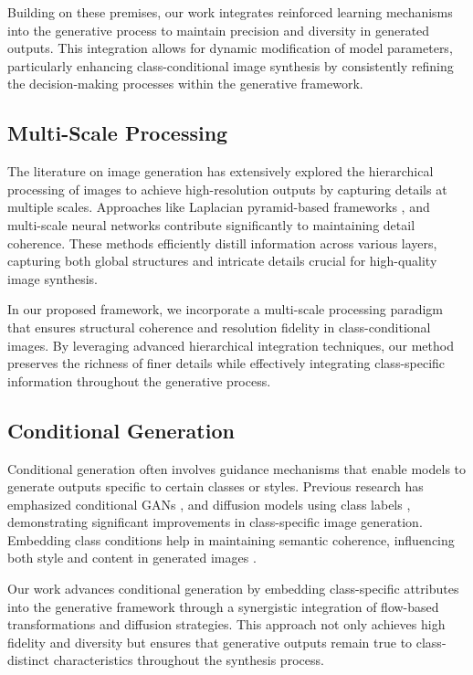 \documentclass{article} %
\begin{document}
Building on these premises, our work integrates reinforced learning mechanisms into the generative process to maintain precision and diversity in generated outputs. This integration allows for dynamic modification of model parameters, particularly enhancing class-conditional image synthesis by consistently refining the decision-making processes within the generative framework.

\subsection{Multi-Scale Processing}

The literature on image generation has extensively explored the hierarchical processing of images to achieve high-resolution outputs by capturing details at multiple scales. Approaches like Laplacian pyramid-based frameworks \citep{denton2015deep}, and multi-scale neural networks \citep{wang2018recovering, ledig2017photo} contribute significantly to maintaining detail coherence. These methods efficiently distill information across various layers, capturing both global structures and intricate details crucial for high-quality image synthesis.

In our proposed framework, we incorporate a multi-scale processing paradigm that ensures structural coherence and resolution fidelity in class-conditional images. By leveraging advanced hierarchical integration techniques, our method preserves the richness of finer details while effectively integrating class-specific information throughout the generative process.

\subsection{Conditional Generation}

Conditional generation often involves guidance mechanisms that enable models to generate outputs specific to certain classes or styles. Previous research has emphasized conditional GANs \citep{mirza2014conditional}, and diffusion models using class labels \citep{dhariwal2021diffusion}, demonstrating significant improvements in class-specific image generation. Embedding class conditions help in maintaining semantic coherence, influencing both style and content in generated images \citep{karras2019style, park2019semantic}.

Our work advances conditional generation by embedding class-specific attributes into the generative framework through a synergistic integration of flow-based transformations and diffusion strategies. This approach not only achieves high fidelity and diversity but ensures that generative outputs remain true to class-distinct characteristics throughout the synthesis process.
\end{document}
